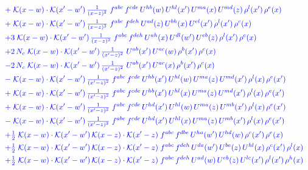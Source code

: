 \documentclass[10pt]{article}
\numberwithin{equation}{section}
\begin{document}
\begin{align}
&\quad{\color{blue}+\;\mathcal{K}(x-w)\cdot\mathcal{K}(x'-w')\,\tfrac{1}{(x-z)^{2}}\;f^{abc}\,f^{cde}\,U^{hb}(w)\,U^{hl}(x')\,U^{ma}(x)\,U^{md}(z)\,\rho^{l}(x')\,\rho^{e}(x)}\notag\\
&\quad{\color{blue}+\;\mathcal{K}(x-w)\cdot\mathcal{K}(x'-w')\,\tfrac{1}{(x-z)^{2}}\;f^{abc}\,f^{deh}\,U^{ad}(z)\,U^{bh}(x)\,U^{el}(x')\,\rho^{l}(x')\,\rho^{c}(x)}\notag\\
&\quad{\color{blue}+3\;\mathcal{K}(x-w)\cdot\mathcal{K}(x'-w')\,\tfrac{1}{(x-z)^{2}}\;f^{abc}\,f^{deh}\,U^{ah}(x)\,U^{dl}(w')\,U^{eb}(z)\,\rho^{l}(x')\,\rho^{c}(x)}\notag\\
&\quad{\color{blue}+2\,N_c\;\mathcal{K}(x-w)\cdot\mathcal{K}(x'-w')\,\tfrac{1}{(x'-z)^{2}}\;U^{ab}(x')\,U^{ac}(w)\,\rho^{b}(x')\,\rho^{c}(x)}\notag\\
&\quad{\color{blue}-2\,N_c\;\mathcal{K}(x-w)\cdot\mathcal{K}(x'-w')\,\tfrac{1}{(x'-z)^{2}}\;U^{ab}(x')\,U^{ac}(x)\,\rho^{b}(x')\,\rho^{c}(x)}\notag\\
&\quad{\color{blue}-\;\mathcal{K}(x-w)\cdot\mathcal{K}(x'-w')\,\tfrac{1}{(x'-z)^{2}}\;f^{abc}\,f^{cde}\,U^{hb}(x')\,U^{hl}(w)\,U^{ma}(z)\,U^{md}(x')\,\rho^{l}(x)\,\rho^{e}(x')}\notag\\
&\quad{\color{blue}+\;\mathcal{K}(x-w)\cdot\mathcal{K}(x'-w')\,\tfrac{1}{(x'-z)^{2}}\;f^{abc}\,f^{cde}\,U^{hb}(x')\,U^{hl}(x)\,U^{ma}(z)\,U^{md}(x')\,\rho^{l}(x)\,\rho^{e}(x')}\notag\\
&\quad{\color{blue}+\;\mathcal{K}(x-w)\cdot\mathcal{K}(x'-w')\,\tfrac{1}{(x'-z)^{2}}\;f^{abc}\,f^{cde}\,U^{hd}(x')\,U^{hl}(w)\,U^{ma}(z)\,U^{mb}(x')\,\rho^{l}(x)\,\rho^{e}(x')}\notag\\
&\quad{\color{blue}-\;\mathcal{K}(x-w)\cdot\mathcal{K}(x'-w')\,\tfrac{1}{(x'-z)^{2}}\;f^{abc}\,f^{cde}\,U^{hd}(x')\,U^{hl}(x)\,U^{ma}(z)\,U^{mb}(x')\,\rho^{l}(x)\,\rho^{e}(x')}\notag\\
&\quad{\color{blue}+\tfrac{1}{2}\;\mathcal{K}(x-w)\cdot\mathcal{K}(x'-w')\,\mathcal{K}(x-z)\cdot\mathcal{K}(x'-z)\;f^{abc}\,f^{dbe}\,U^{ha}(w')\,U^{hd}(w)\,\rho^{c}(x')\,\rho^{e}(x)}\notag\\
&\quad{\color{blue}+\tfrac{1}{2}\;\mathcal{K}(x-w)\cdot\mathcal{K}(x'-w')\,\mathcal{K}(x-z)\cdot\mathcal{K}(x'-z)\;f^{abc}\,f^{deh}\,U^{da}(w')\,U^{be}(z)\,U^{hl}(x)\,\rho^{c}(x')\,\rho^{l}(x)}\notag\\
&\quad{\color{blue}+\tfrac{1}{2}\;\mathcal{K}(x-w)\cdot\mathcal{K}(x'-w')\,\mathcal{K}(x-z)\cdot\mathcal{K}(x'-z)\;f^{abc}\,f^{deh}\,U^{ad}(w)\,U^{eb}(z)\,U^{lc}(x')\,\rho^{l}(x')\,\rho^{h}(x)}\notag\\

\end{align}
\end{document}
